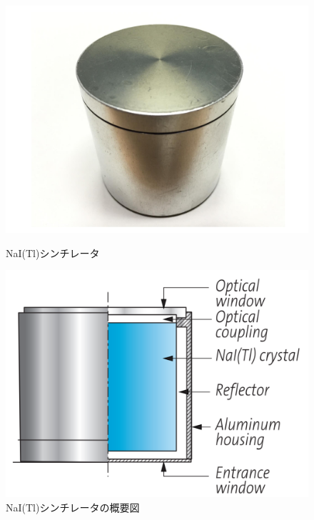 \begin{figure}[htbp]
\begin{minipage}{0.5\hsize}
\centering
\includegraphics[keepaspectratio,scale=0.35]{fig/ybm/naitl.pdf}
\caption{NaI(Tl)シンチレータ}
\label{fig:naitl}
\end{minipage}
\begin{minipage}{0.5\hsize}
\centering
\includegraphics[keepaspectratio,scale=0.35]{fig/ybm/naitl0.pdf}
	\caption{NaI(Tl)シンチレータの概要図\cite{nai}}
\label{fig:naitl0}
\end{minipage}
\end{figure}


